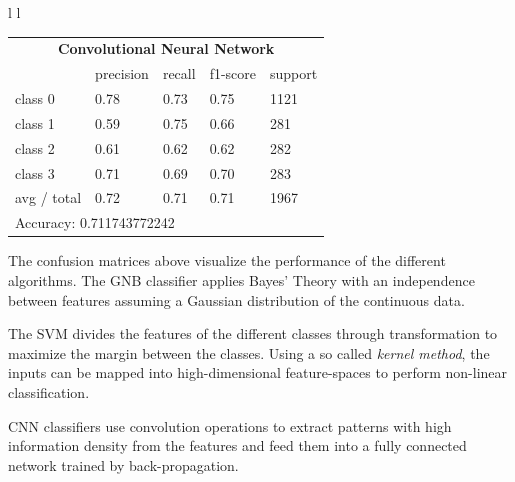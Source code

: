 \documentclass[landscape,final,a1paper,fontscale=0.4]{../baposter/baposter}
\begin{document}
\begin{poster}
{\begin{flushleft}
{\begin{tabular}{ l l }
{\begin{tabular}[b]{ l l l l l }
				\multicolumn{5}{c}{\textbf{Convolutional Neural Network}} \\[1.2ex]
				& precision & recall & f1-score & support \\
				class 0     & 0.78      & 0.73   & 0.75     & 1121    \\
				class 1     & 0.59      & 0.75   & 0.66     & 281     \\
				class 2     & 0.61      & 0.62   & 0.62     & 282     \\
				class 3     & 0.71      & 0.69   & 0.70     & 283     \\
				avg / total & 0.72      & 0.71   & 0.71     & 1967    \\[1.1ex]
				\multicolumn{5}{l}{Accuracy: 0.711743772242 }\\
			\end{tabular}
		} 
	\end{tabular}
	}

\end{flushleft}
	
	The confusion matrices above visualize the performance of the different algorithms.
	The GNB classifier applies Bayes' Theory with an independence between features assuming a Gaussian distribution of the continuous data.
	
	The SVM divides the features of the different classes through transformation to maximize the margin between the classes. Using a so called \emph{kernel method}, the inputs can be mapped into high-dimensional feature-spaces to perform non-linear classification.
	
	CNN classifiers use convolution operations to extract patterns with high information density from the features and feed them into a fully connected network trained by back-propagation.
}


\end{poster}
\end{document}
